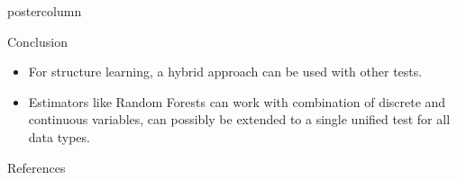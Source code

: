 \documentclass{beamer}
\begin{document}
\begin{frame}
\begin{columns}
\begin{column}{0.33\textwidth}
\begin{beamercolorbox}[center]{postercolumn}
\begin{minipage}{.98\textwidth}
{\begin{myblock}{Conclusion}
\begin{itemize}
								conditional variables.
							\item For structure learning, a hybrid approach can be used
								with other tests.
							\item Estimators like Random Forests can work with combination
								of discrete and continuous variables, can possibly be
								extended to a single unified test for all data types.
						\end{itemize}
					\end{myblock}\vfill
					\begin{myblock}{References}
						\footnotesize
						
						
					\end{myblock}\vfill
		}\end{minipage}\end{beamercolorbox}
	\end{column}
\end{columns}
\end{frame}
\end{document}
